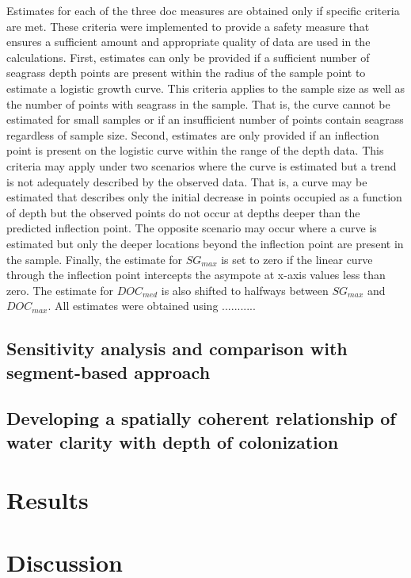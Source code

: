 \documentclass[letterpaper,12pt,oneside]{article}\usepackage[]{graphicx}\usepackage[]{color}
\begin{document}
Estimates for each of the three \ac{doc} measures are obtained only if specific criteria are met.  These criteria were implemented to provide a safety measure that ensures a sufficient amount and appropriate quality of data are used in the calculations.  First, estimates can only be provided if a sufficient number of seagrass depth points are present within the radius of the sample point to estimate a logistic growth curve.  This criteria applies to the sample size as well as the number of points with seagrass in the sample.  That is, the curve cannot be estimated for small samples or if an insufficient number of points contain seagrass regardless of sample size.  Second, estimates are only provided if an inflection point is present on the logistic curve within the range of the depth data.  This criteria may apply under two scenarios where the curve is estimated but a trend is not adequately described by the observed data.  That is, a curve may be estimated that describes only the initial decrease in points occupied as a function of depth but the observed points do not occur at depths deeper than the predicted inflection point.  The opposite scenario may occur where a curve is estimated but only the deeper locations beyond the inflection point are present in the sample.  Finally, the estimate for $SG_{max}$ is set to zero if the linear curve through the inflection point intercepts the asympote at x-axis values less than zero.  The estimate for $DOC_{med}$ is also shifted to halfways between $SG_{max}$ and $DOC_{max}$.  All estimates were obtained using ...........

\subsection{Sensitivity analysis and comparison with segment-based approach}

\subsection{Developing a spatially coherent relationship of water clarity with depth of colonization}

\section{Results}

\section{Discussion}
\end{document}
